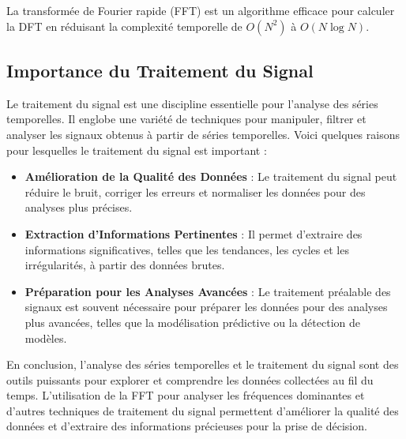 La transformée de Fourier rapide (FFT) est un algorithme efficace pour calculer
la DFT en réduisant la complexité temporelle de $O(N^2)$ à $O(N \log N)$.

\subsection*{Importance du Traitement du Signal}

Le traitement du signal est une discipline essentielle pour l'analyse des
séries temporelles. Il englobe une variété de techniques pour manipuler,
filtrer et analyser les signaux obtenus à partir de séries temporelles. Voici
quelques raisons pour lesquelles le traitement du signal est important :

\begin{itemize}
	\item \textbf{Amélioration de la Qualité des Données} : Le traitement du signal peut réduire le bruit, corriger les erreurs et normaliser les données pour des analyses plus précises.
	\item \textbf{Extraction d'Informations Pertinentes} : Il permet d'extraire des informations significatives, telles que les tendances, les cycles et les irrégularités, à partir des données brutes.
	\item \textbf{Préparation pour les Analyses Avancées} : Le traitement préalable des signaux est souvent nécessaire pour préparer les données pour des analyses plus avancées, telles que la modélisation prédictive ou la détection de modèles.
\end{itemize}

En conclusion, l'analyse des séries temporelles et le traitement du signal sont
des outils puissants pour explorer et comprendre les données collectées au fil
du temps. L'utilisation de la FFT pour analyser les fréquences dominantes et
d'autres techniques de traitement du signal permettent d'améliorer la qualité
des données et d'extraire des informations précieuses pour la prise de
décision.